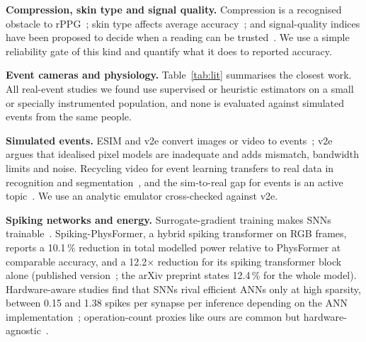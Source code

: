 \documentclass[10pt,journal]{IEEEtran}
\begin{document}
\textbf{Compression, skin type and signal quality.} Compression is a recognised obstacle to rPPG~\cite{mcduff2017compression,rapczynski2019,yu2019compressed}; skin type affects average accuracy~\cite{nowara2020skin}; and signal-quality indices have been proposed to decide when a reading can be trusted~\cite{elgendi2024sqi}. We use a simple reliability gate of this kind and quantify what it does to reported accuracy.

\textbf{Event cameras and physiology.} Table~\ref{tab:lit} summarises the closest work. All real-event studies we found use supervised or heuristic estimators on a small or specially instrumented population, and none is evaluated against simulated events from the same people.

\textbf{Simulated events.} ESIM and v2e convert images or video to events~\cite{rebecq2018esim,hu2021v2e}; v2e argues that idealised pixel models are inadequate and adds mismatch, bandwidth limits and noise. Recycling video for event learning transfers to real data in recognition and segmentation~\cite{gehrig2020video2events}, and the sim-to-real gap for events is an active topic~\cite{stoffregen2020simreal}. We use an analytic emulator cross-checked against v2e.

\textbf{Spiking networks and energy.} Surrogate-gradient training makes SNNs trainable~\cite{neftci2019surrogate,eshraghian2023snntorch}. Spiking-PhysFormer, a hybrid spiking transformer on RGB frames, reports a 10.1\,\% reduction in total modelled power relative to PhysFormer at comparable accuracy, and a 12.2$\times$ reduction for its spiking transformer block alone (published version~\cite{liu2025spikingphysformer}; the arXiv preprint states 12.4\,\% for the whole model). Hardware-aware studies find that SNNs rival efficient ANNs only at high sparsity, between 0.15 and 1.38 spikes per synapse per inference depending on the ANN implementation~\cite{dampfhoffer2023}; operation-count proxies like ours are common but hardware-agnostic~\cite{lemaire2022}.
\end{document}

